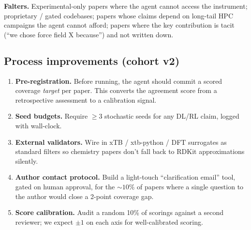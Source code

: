 \textbf{Falters.} Experimental-only papers where the agent cannot access the
instrument; proprietary / gated codebases; papers whose claims depend on
long-tail HPC campaigns the agent cannot afford; papers where the key
contribution is tacit (``we chose force field X because'') and not written
down.

\subsection{Process improvements (cohort v2)}
\begin{enumerate}
\item \textbf{Pre-registration.} Before running, the agent should commit a
scored coverage \emph{target} per paper. This converts the agreement score
from a retrospective assessment to a calibration signal.
\item \textbf{Seed budgets.} Require $\geq 3$ stochastic seeds for any DL/RL
claim, logged with wall-clock.
\item \textbf{External validators.} Wire in xTB / xtb-python / DFT surrogates
as standard filters so chemistry papers don't fall back to RDKit
approximations silently.
\item \textbf{Author contact protocol.} Build a light-touch
``clarification email'' tool, gated on human approval, for the $\sim 10\%$ of
papers where a single question to the author would close a 2-point coverage
gap.
\item \textbf{Score calibration.} Audit a random 10\% of scorings against a
second reviewer; we expect $\pm 1$ on each axis for well-calibrated scoring.
\end{enumerate}
